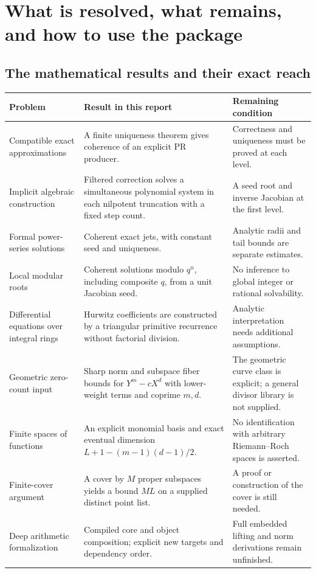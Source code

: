 \section{What is resolved, what remains, and how to use the package}
\label{sec:status}

\subsection{The mathematical results and their exact reach}

\begin{longtable}{P{.24\linewidth}P{.39\linewidth}P{.28\linewidth}}
\toprule
Problem & Result in this report & Remaining condition\\
\midrule\endhead
Compatible exact approximations & A finite uniqueness theorem gives
coherence of an explicit PR producer. & Correctness and uniqueness must
be proved at each level.\\[4pt]
Implicit algebraic construction & Filtered correction solves a simultaneous
polynomial system in each nilpotent truncation with a fixed step count.
& A seed root and inverse Jacobian at the first level.\\[4pt]
Formal power-series solutions & Coherent exact jets, with constant seed and
uniqueness. & Analytic radii and tail bounds are separate estimates.\\[4pt]
Local modular roots & Coherent solutions modulo \(q^n\), including composite
\(q\), from a unit Jacobian seed. & No inference to global integer or
rational solvability.\\[4pt]
Differential equations over integral rings & Hurwitz coefficients are
constructed by a triangular primitive recurrence without factorial
division. & Analytic interpretation needs additional assumptions.\\[4pt]
Geometric zero-count input & Sharp norm and subspace fiber bounds for
\(Y^m-cX^d\) with lower-weight terms and coprime \(m,d\). & The geometric
curve class is explicit; a general divisor library is not supplied.\\[4pt]
Finite spaces of functions & An explicit monomial basis and exact eventual
dimension \(L+1-(m-1)(d-1)/2\). & No identification with arbitrary
Riemann--Roch spaces is asserted.\\[4pt]
Finite-cover argument & A cover by \(M\) proper subspaces yields a bound
\(ML\) on a supplied distinct point list. & A proof or construction of the
cover is still needed.\\[4pt]
Deep arithmetic formalization & Compiled core and object composition;
explicit new targets and dependency order. & Full embedded lifting and
norm derivations remain unfinished.\\
\bottomrule
\end{longtable}


